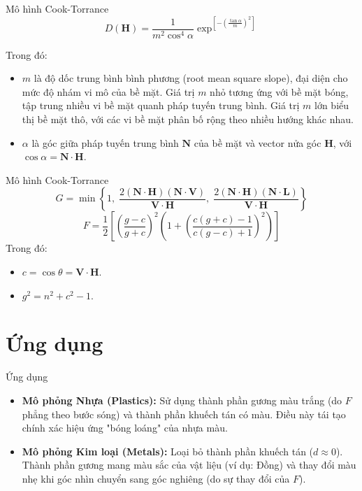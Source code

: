 \documentclass[11pt, aspectratio=169]{beamer}
\begin{document}
\begin{frame}{Mô hình Cook-Torrance}
	\begin{equation}
	D(\mathbf{H}) = \frac{1}{m^2 \cos^4 \alpha} \exp^{[-(\frac{\tan \alpha}{m})^2]}
	\end{equation}
	
	Trong đó:
	\begin{itemize}
	\item $m$ là độ dốc trung bình bình phương (root mean square slope), đại diện cho mức độ nhám vi mô của bề mặt. Giá trị $m$ nhỏ tương ứng với bề mặt bóng, tập trung nhiều vi bề mặt quanh pháp tuyến trung bình. Giá trị $m$ lớn biểu thị bề mặt thô, với các vi bề mặt phân bố rộng theo nhiều hướng khác nhau.
	\item $\alpha$ là góc giữa pháp tuyến trung bình $\mathbf{N}$ của bề mặt và vector nửa góc $\mathbf{H}$, với $\cos \alpha = \mathbf{N} \cdot \mathbf{H}$.
	\end{itemize}
\end{frame}

\begin{frame}{Mô hình Cook-Torrance}
	\begin{equation}
		G = \min \left\{
		1,\;
		\frac{2(\mathbf{N} \cdot \mathbf{H})(\mathbf{N} \cdot \mathbf{V})}{\mathbf{V} \cdot \mathbf{H}},\;
		\frac{2(\mathbf{N} \cdot \mathbf{H})(\mathbf{N} \cdot \mathbf{L})}{\mathbf{V} \cdot \mathbf{H}}
		\right\}
	\end{equation}
	\begin{equation}\label{eq:fresnel}
		F = \frac{1}{2}
		\left[
		\left( \frac{g - c}{g + c} \right)^2
		\left(
		1 +
		\left(
		\frac{c(g + c) - 1}{c(g - c) + 1}
		\right)^2
		\right)
		\right]
	\end{equation}
	Trong đó:
	\begin{itemize}
		\item $c = \cos \theta = \mathbf{V} \cdot \mathbf{H}$.
		\item $g^2 = n^2 + c^2 - 1$.
	\end{itemize}
\end{frame}

\section{Ứng dụng}
\begin{frame}{Ứng dụng}
	\begin{itemize}
		\item \textbf{Mô phỏng Nhựa (Plastics):} Sử dụng thành phần gương màu trắng (do $F$ phẳng theo bước sóng) và thành phần khuếch tán có màu. Điều này tái tạo chính xác hiệu ứng "bóng loáng" của nhựa màu.
		\item \textbf{Mô phỏng Kim loại (Metals):} Loại bỏ thành phần khuếch tán ($d \approx 0$). Thành phần gương mang màu sắc của vật liệu (ví dụ: Đồng) và thay đổi màu nhẹ khi góc nhìn chuyển sang góc nghiêng (do sự thay đổi của $F$).
	\end{itemize}
\end{frame}
\end{document}
